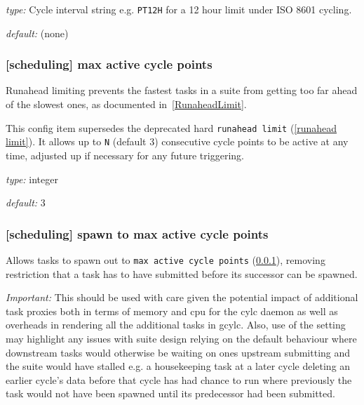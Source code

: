 \begin{myitemize}
    \item {\em type:} Cycle interval string e.g. \lstinline=PT12H=
    for a 12 hour limit under ISO 8601 cycling.
    \item {\em default:} (none)
\end{myitemize}

\subsubsection[max active cycle points]{[scheduling] \textrightarrow
 max active cycle points}
\label{max active cycle points}

Runahead limiting prevents the fastest tasks in a suite from getting too far
ahead of the slowest ones, as documented in~\ref{RunaheadLimit}.

This config item supersedes the deprecated hard \lstinline=runahead limit=
(\ref{runahead limit}). It allows up to \lstinline=N= (default 3) consecutive
cycle points to be active at any time, adjusted up if necessary for
any future triggering.

\begin{myitemize}
    \item {\em type:} integer
    \item {\em default:} 3
\end{myitemize}

\subsubsection[spawn to max active cycle points]{[scheduling] \textrightarrow
 spawn to max active cycle points}
\label{spawn to max active cycle points}

Allows tasks to spawn out to \lstinline=max active cycle points=
(\ref{max active cycle points}), removing restriction that a task has to have
submitted before its successor can be spawned.

{\em Important:} This should be used with care given the potential impact of
additional task proxies both in terms of memory and cpu for the cylc daemon as
well as overheads in rendering all the additional tasks in gcylc. Also, use
of the setting may highlight any issues with suite design relying on the
default behaviour where downstream tasks would otherwise be waiting on ones
upstream submitting and the suite would have stalled e.g. a housekeeping task
at a later cycle deleting an earlier cycle's data before that cycle has had
chance to run where previously the task would not have been spawned until its
predecessor had been submitted.

